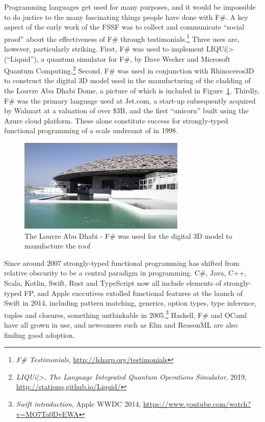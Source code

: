 \documentclass[acmsmall]{acmart}\settopmatter{}
\begin{document}
Programming languages get used for many purposes, and it would be impossible to do justice to the many fascinating
things people have done with F\#.  A key aspect of the early work of the FSSF was to collect and communicate
“social proof” about the effectiveness of F\# through testimonials.\footnote{\textit{F\# Testimonials}, \url{http://fsharp.org/testimonials}}
Three uses are, however, particularly striking.
First, F\# was used to implement LIQUi|> (“Liquid”), a quantum simulator for F\#, by Dave Wecker and Microsoft
Quantum Computing.\footnote{\textit{LIQUi|>, The Language Integrated Quantum Operations Simulator}, 2019, \url{http://stationq.github.io/Liquid/}}
  Second, F\# was used in conjunction with Rhinoceros3D to construct the digital 3D model
used in the manufacturing of the cladding of the Louvre Abu Dhabi Dome, a picture of which is included in Figure~\ref{fig:fig4}.
Thirdly, F\# was the primary language used at Jet.com, a start-up subsequently acquired by Walmart at a valuation
of over \$3B, and the first “unicorn” built using the Azure cloud platform. These alone constitute success for
strongly-typed functional programming of a scale undreamt of in 1998.

\begin{figure}

  \includegraphics[width=0.8\linewidth]{fig4.jpg}
  \caption{The Louvre Abu Dhabi  - F\# was used for the digital 3D model to manufacture the roof}
  \label{fig:fig4}

\end{figure}

Since around 2007 strongly-typed functional programming has shifted from relative obscurity to be a central paradigm
in programming. C\#, Java, C++, Scala, Kotlin, Swift, Rust and TypeScript now all include elements of
strongly-typed FP, and Apple executives extolled functional features at the launch of Swift in 2014, including
pattern matching, generics, option types, type inference, tuples and closures,
something unthinkable in 2005.\footnote{\textit{Swift introduction}, Apple WWDC 2014, \url{https://www.youtube.com/watch?v=MO7Ta0DvEWA}} Haskell,
F\# and OCaml have all grown in use, and newcomers such as Elm and ReasonML are also finding good adoption.
\end{document}
